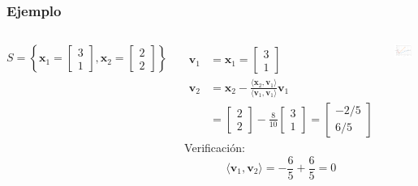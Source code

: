\documentclass[9pt, aspectratio=169]{beamer}
\begin{document}
\begin{frame}
    \frametitle{Ejemplo}
    \begin{columns}[c]
        \[ S = \left\{ \bm{x}_1 = \begin{bmatrix} 3 \\ 1 \end{bmatrix}, \bm{x}_2 = \begin{bmatrix} 2 \\ 2 \end{bmatrix} \right\} \]
        \pause

        \begin{align*}
            \bm{v}_1 & = \bm{x}_1 = \begin{bmatrix} 3 \\ 1 \end{bmatrix} \\
            \bm{v}_2 &= \bm{x}_2 - \frac{\langle \bm{x}_2, \bm{v}_1 \rangle }{\langle \bm{v}_1, \bm{v}_1 \rangle } \bm{v}_1 \\
                     &= \begin{bmatrix} 2 \\ 2 \end{bmatrix} - \frac{8}{10} \begin{bmatrix} 3 \\ 1 \end{bmatrix} = \begin{bmatrix} -2/5 \\ 6/5 \end{bmatrix}
        \end{align*}
        \pause
        Verificación:
        \[ \langle \bm{v}_1, \bm{v}_2 \rangle = -\frac{6}{5} + \frac{6}{5} = 0 \]
\pause

        \begin{center}
          \includegraphics[width=0.8\textwidth]{code/gram-schmidt.pdf}
        \end{center}


\end{columns}
\end{frame}
\end{document}
